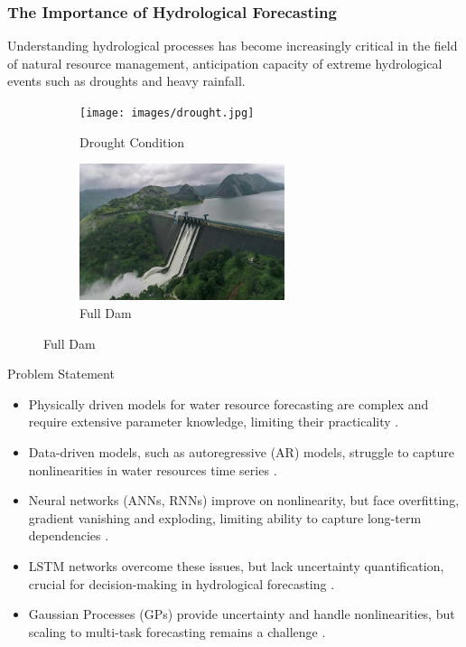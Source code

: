 \begin{frame}
	\frametitle{The Importance of Hydrological Forecasting}
	\begin{block}{}
	Understanding hydrological processes has become increasingly critical in the field of natural resource management, anticipation capacity of extreme hydrological events such as droughts and heavy rainfall.
	\end{block}
	\begin{figure}
		\centering
		\begin{subfigure}[b]{0.45\textwidth}
			\centering
			\texttt{[image: images/drought.jpg]}
			\caption{Drought Condition}
		\end{subfigure}
		\hfill
		\begin{subfigure}[b]{0.45\textwidth}
			\centering
			\includegraphics[width=\textwidth, height=4cm]{images/full_dam.jpg}
			\caption{Full Dam}
		\end{subfigure}
	\end{figure}
	
\end{frame}

\begin{frame}{Problem Statement}
	\begin{block}{}
	\begin{itemize}
		\item Physically driven models for water resource forecasting are complex and require extensive parameter knowledge, limiting their practicality \cite{Yaseen2018, HKASHANI2016340}.
		\item Data-driven models, such as autoregressive (AR) models, struggle to capture nonlinearities in water resources time series \cite{10.2166/wst.2020.369}.
		\item Neural networks (ANNs, RNNs) improve on nonlinearity, but face overfitting, gradient vanishing and exploding, limiting ability to capture long-term dependencies \cite{Abdollahi2017, Shiau2016, KHAN2020125380}.
		\item LSTM networks overcome these issues, but lack uncertainty quantification, crucial for decision-making in hydrological forecasting \cite{lakshminarayanan2017simple, gal2016dropout}.
		\item Gaussian Processes (GPs) provide uncertainty and handle nonlinearities, but scaling to multi-task forecasting remains a challenge \cite{QUILTY2020104718, NIU2021102562,bruinsma2020scalable}.
	\end{itemize}
	\end{block}
\end{frame}


